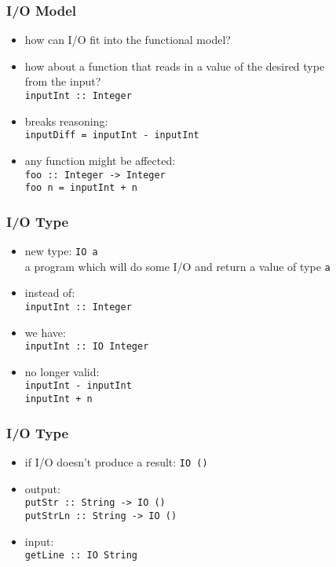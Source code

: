 \documentclass[dvipsnames]{beamer}
\theoremstyle{plain}
\begin{document}
\begin{frame}
  \frametitle{I/O Model}

  \begin{itemize}
    \item how can I/O fit into the functional model?

    \bigskip
    \item how about a function that reads in a value of the desired type\\
      from the input?\\
      \lstinline|inputInt :: Integer|

    \pause
    \medskip
    \item breaks reasoning:\\
      \lstinline|inputDiff = inputInt - inputInt|

    \medskip
    \item any function might be affected:\\
      \lstinline|foo :: Integer -> Integer|\\
      \lstinline|foo n = inputInt + n|\\
  \end{itemize}
\end{frame}

\begin{frame}
  \frametitle{I/O Type}

  \begin{itemize}
    \item new type: \lstinline|IO a|\\
      a program which will do some I/O and return a value of type \texttt{a}

    \medskip
    \item instead of:\\
      \lstinline|inputInt :: Integer|
    \item we have:\\
      \lstinline|inputInt :: IO Integer|

    \pause
    \medskip
    \item no longer valid:\\
      \lstinline|inputInt - inputInt|\\
      \lstinline|inputInt + n|
  \end{itemize}
\end{frame}

\begin{frame}
  \frametitle{I/O Type}

  \begin{itemize}
    \item if I/O doesn't produce a result: \lstinline|IO ()|

    \medskip
    \item output:\\
      \lstinline|putStr :: String -> IO ()|\\
      \lstinline|putStrLn :: String -> IO ()|

    \smallskip
    \item input:\\
      \lstinline|getLine :: IO String|\\
  \end{itemize}
\end{frame}
\end{document}
